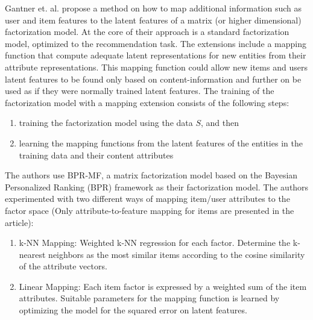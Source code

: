 
Gantner et. al. \cite{Ganter2010} propose a method on how to map additional
information such as user and item features to the latent features of a matrix
(or higher dimensional) factorization model. At the core of their approach is a
standard factorization model, optimized to the recommendation task. The
extensions include a mapping function that compute adequate latent
representations for new entities from their attribute representations. This
mapping function could allow new items and users latent features to be found
only based on content-information and further on be used as if they were
normally trained latent features. The training of the factorization model with
a mapping extension consists of the following steps:

\begin{enumerate}
\item training the factorization model using the data $S$, and then
\item learning the mapping functions from the latent features of the entities in the training data and their content attributes
\end{enumerate}

The authors use BPR-MF, a matrix factorization model based on the Bayesian Personalized Ranking (BPR) framework as their factorization model. The authors experimented with two different ways of mapping item/user attributes to the factor space (Only attribute-to-feature mapping for items are presented in the article):

\begin{enumerate}
\item k-NN Mapping:	Weighted k-NN regression for each factor. Determine the k-nearest neighbors as the most similar items according to the cosine similarity of the attribute vectors.
\item Linear Mapping: Each item factor is expressed by a weighted sum of the item attributes. Suitable parameters for the mapping function is learned by optimizing the model for the squared error on latent features.
\end{enumerate}

